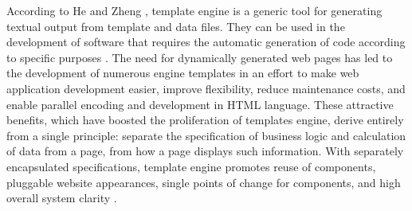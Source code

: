 

According to He and Zheng \cite{he2009}, template engine is a generic tool for generating textual output from template and data files. They can be used in the development of software that requires the automatic generation of code according to specific purposes \cite{benato2017}. The need for dynamically generated web pages has led to the development of numerous engine templates in an effort to make web application development easier, improve flexibility, reduce maintenance costs, and enable parallel encoding and development in HTML language. These attractive benefits, which have boosted the proliferation of templates engine, derive entirely from a single principle: separate the specification of business logic and calculation of data from a page, from how a page displays such information. With separately encapsulated specifications, template engine promotes reuse of components, pluggable website appearances, single points of change for components, and high overall system clarity \cite{parr2004}.

